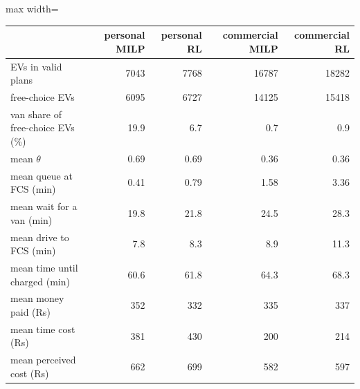 \small
\begin{adjustbox}{max width=\linewidth}
\begin{tabular}{@{}lrrrr@{}}
\toprule
 & personal MILP & personal RL & commercial MILP & commercial RL \\
\midrule
EVs in valid plans & 7043 & 7768 & 16787 & 18282 \\
free-choice EVs & 6095 & 6727 & 14125 & 15418 \\
van share of free-choice EVs (\%) & 19.9 & 6.7 & 0.7 & 0.9 \\
mean $\theta$ & 0.69 & 0.69 & 0.36 & 0.36 \\
mean queue at FCS (min) & 0.41 & 0.79 & 1.58 & 3.36 \\
mean wait for a van (min) & 19.8 & 21.8 & 24.5 & 28.3 \\
mean drive to FCS (min) & 7.8 & 8.3 & 8.9 & 11.3 \\
mean time until charged (min) & 60.6 & 61.8 & 64.3 & 68.3 \\
mean money paid (Rs) & 352 & 332 & 335 & 337 \\
mean time cost (Rs) & 381 & 430 & 200 & 214 \\
mean perceived cost (Rs) & 662 & 699 & 582 & 597 \\
\bottomrule
\end{tabular}
\end{adjustbox}
